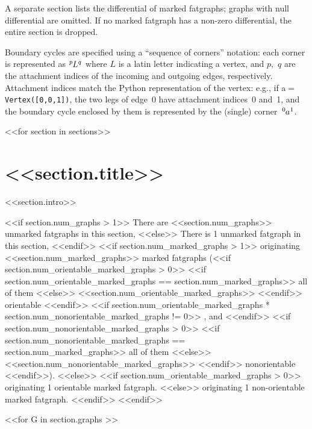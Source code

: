 \documentclass[a4paper]{article}
\newcommand{\corner}[3]{\ensuremath{\tensor[^{#2}]{#1}{^{#3}}}}
\begin{document}
A separate section lists the differential of marked fatgraphs; graphs
with null differential are omitted.  If no marked fatgraph has a
non-zero differential, the entire section is dropped.

Boundary cycles are specified using a ``sequence of corners''
notation: each corner is represented as \corner{L}{p}{q} where $L$ is
a latin letter indicating a vertex, and $p$,~$q$ are the attachment
indices of the incoming and outgoing edges, respectively.  Attachment
indices match the Python representation of the vertex: e.g., if
a$=$\verb'Vertex([0,0,1])', the two legs of edge~$0$ have attachment
indices~0 and~1, and the boundary cycle enclosed by them is
represented by the (single) corner~\corner{a}{0}{1}.

\clearpage


<<for section in sections>>
\section{<<section.title>>}
<<section.intro>>

<<if section.num_graphs > 1>>%
There are <<section.num_graphs>> unmarked fatgraphs in this section,
<<else>>%
There is 1 unmarked fatgraph in this section,
<<endif>>%
<<if section.num_marked_graphs > 1>>
originating <<section.num_marked_graphs>> marked fatgraphs 
(<<if section.num_orientable_marked_graphs > 0>>%
  <<if section.num_orientable_marked_graphs == section.num_marked_graphs>>%
    all of them
  <<else>>%
    <<section.num_orientable_marked_graphs>>
  <<endif>> %
  orientable%
 <<endif>>%
 <<if section.num_orientable_marked_graphs * section.num_nonorientable_marked_graphs != 0>>%
 , and %
 <<endif>>%
 <<if section.num_nonorientable_marked_graphs > 0>>%
   <<if section.num_nonorientable_marked_graphs == section.num_marked_graphs>>%
   all of them
   <<else>>%
     <<section.num_nonorientable_marked_graphs>>
   <<endif>> %
   nonorientable%
 <<endif>>).
<<else>>%
  <<if section.num_orientable_marked_graphs > 0>>%
    originating 1 orientable marked fatgraph.
  <<else>>
    originating 1 non-orientable marked fatgraph.
  <<endif>>
<<endif>>

<<for G in section.graphs >>
\vspace{2em}
\end{document}
